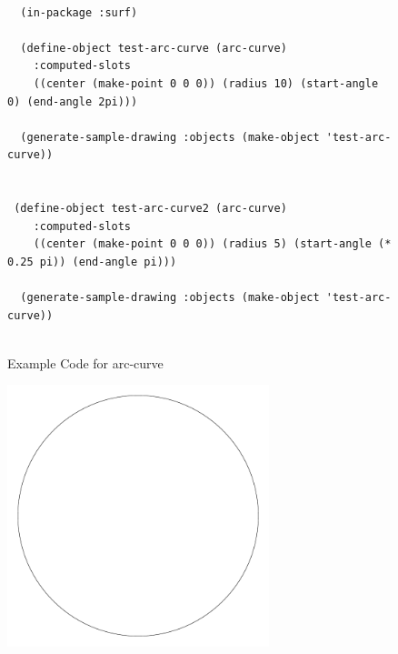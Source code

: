 \documentclass [11pt]{book}
\begin{document}
\begin{itemize}
\begin{description}
\end{description}




\begin{figure}
\begin{lrbox}{\boxedverb}
\begin{minipage}{\linewidth}
{\small

\begin{verbatim}

  (in-package :surf)

  (define-object test-arc-curve (arc-curve)
    :computed-slots
    ((center (make-point 0 0 0)) (radius 10) (start-angle 0) (end-angle 2pi)))

  (generate-sample-drawing :objects (make-object 'test-arc-curve))


 (define-object test-arc-curve2 (arc-curve)
    :computed-slots
    ((center (make-point 0 0 0)) (radius 5) (start-angle (* 0.25 pi)) (end-angle pi)))
  
  (generate-sample-drawing :objects (make-object 'test-arc-curve))


\end{verbatim}}
\end{minipage}
\end{lrbox}
\fbox{\usebox{\boxedverb}}

\caption{Example Code for arc-curve}

\label{fig:example-code-arc-curve}

\end{figure}

\begin{figure}
\begin{center}
\includegraphics[width=3in,height=3in]{../images/example-arc-curve.pdf}
\end{center}


\end{figure}
\end{itemize}
\end{document}
